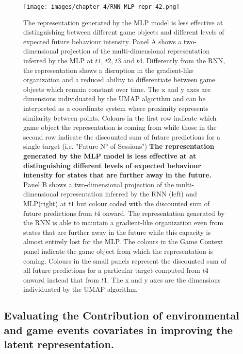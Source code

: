 \begin{figure}[ht]
\centering
\texttt{[image: images/chapter\_4/RNN\_MLP\_repr\_42.png]}
\caption[\textbf{Lower dimensional representation of the latent states generated by the time-distributed MLP architecture}]{The representation generated by the MLP model is less effective at distinguishing between different game objects and different levels of expected future behaviour intensity. Panel A shows a two-dimensional projection of the multi-dimensional representation inferred by the MLP at $t1$, $t2$, $t3$ and $t4$. Differently from the RNN, the representation shows a disruption in the gradient-like organization and a reduced ability to differentiate between game objects which remain constant over time. The x and y axes are dimensions individuated by the UMAP algorithm and can be interpreted as a coordinate system where proximity represents similarity between points. Colours in the first row indicate which game object the representation is coming from while those in the second row indicate the discounted sum of future predictions for a single target (i.e. "Future N° of Sessions") \textbf{The representation generated by the MLP model is less effective at at distinguishing different levels of expected behaviour intensity for states that are further away in the future.} Panel B shows a two-dimensional projection of the multi-dimensional representation inferred by the RNN (left) and MLP(right) at $t1$ but colour coded with the discounted sum of future predictions from $t4$ onward. The representation generated by the RNN is able to maintain a gradient-like organization even from states that are further away in the future while this capacity is almost entirely lost for the MLP. The colours in the Game Context panel indicate the game object from which the representation is coming. Colours in the small panels represent the discounted sum of all future predictions for a particular target computed from $t4$ onward instead that from $t1$. The x and y axes are the dimensions individuated by the UMAP algorithm.}
\label{predictive_panel}
\end{figure}

\subsection{Evaluating the Contribution of environmental and game events covariates in improving the latent representation.}
\lorem

